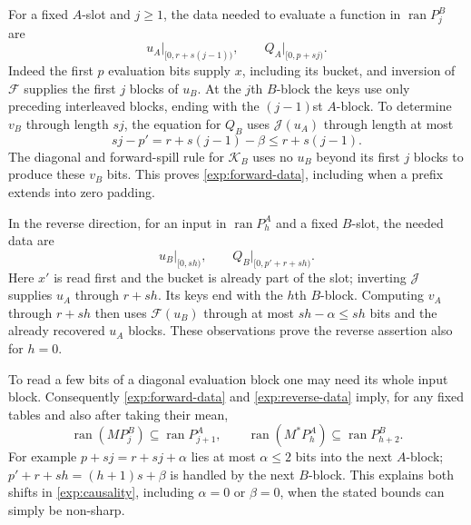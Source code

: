 For a fixed $A$-slot and $j\geq1$, the data needed to evaluate a
function in $\operatorname{ran}P_j^B$ are
\begin{equation}
 u_A\big|_{[0,r+s(j-1))},\qquad
 Q_A\big|_{[0,p+sj)}.\label{exp:forward-data}
\end{equation}
Indeed the first $p$ evaluation bits supply $x$, including its bucket,
and inversion of $\mathcal F$ supplies the first $j$ blocks of $u_B$.
At the $j$th $B$-block the keys use only preceding interleaved blocks,
ending with the $(j-1)$st $A$-block. To determine $v_B$ through
length $sj$, the equation for $Q_B$ uses $\mathcal J(u_A)$ through
length at most
\[
 sj-p'=r+s(j-1)-\beta\leq r+s(j-1).
\]
The diagonal and forward-spill rule for $\mathcal K_B$ uses no
$u_B$ beyond its first $j$ blocks to produce these $v_B$ bits.
This proves \eqref{exp:forward-data}, including when a prefix extends
into zero padding.

In the reverse direction, for an input in $\operatorname{ran}P_h^A$
and a fixed $B$-slot, the needed data are
\begin{equation}
 u_B\big|_{[0,sh)},\qquad
 Q_B\big|_{[0,p'+r+sh)}.\label{exp:reverse-data}
\end{equation}
Here $x'$ is read first and the bucket is already part of the slot;
inverting $\mathcal J$ supplies $u_A$ through $r+sh$. Its keys end
with the $h$th $B$-block. Computing $v_A$ through $r+sh$ then uses
$\mathcal F(u_B)$ through at most $sh-\alpha\leq sh$ bits and
the already recovered $u_A$ blocks. These observations prove the
reverse assertion also for $h=0$.

To read a few bits of a diagonal evaluation block one may need its
whole input block. Consequently \eqref{exp:forward-data} and
\eqref{exp:reverse-data} imply, for any fixed tables and also after
taking their mean,
\begin{equation}
 \operatorname{ran}(MP_j^B)\subseteq\operatorname{ran}P_{j+1}^A,
 \qquad
 \operatorname{ran}(M^*P_h^A)\subseteq\operatorname{ran}P_{h+2}^B.
 \label{exp:causality}
\end{equation}
For example $p+sj=r+sj+\alpha$ lies at most $\alpha\leq2$ bits
into the next $A$-block; $p'+r+sh=(h+1)s+\beta$ is handled
by the next $B$-block. This explains both shifts in
\eqref{exp:causality}, including $\alpha=0$ or $\beta=0$, when
the stated bounds can simply be non-sharp.

